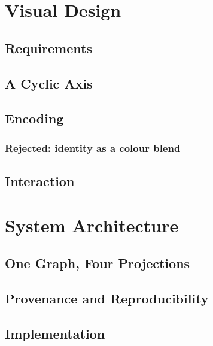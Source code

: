\documentclass[journal]{IEEEtran}
\begin{document}
\section{Visual Design}
\label{sec:vis}

\subsection{Requirements}


\subsection{A Cyclic Axis}


\subsection{Encoding}


\subsubsection*{Rejected: identity as a colour blend}


\subsection{Interaction}




\section{System Architecture}

\subsection{One Graph, Four Projections}


\subsection{Provenance and Reproducibility}

\subsection{Implementation}

\end{document}
